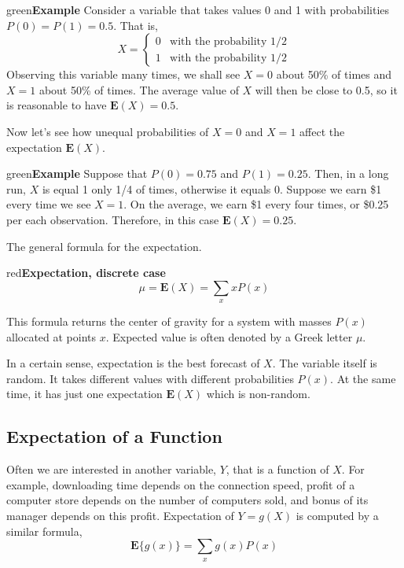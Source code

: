\documentclass{article}
\newenvironment{example}[1]{\begin{mybox}{green}{\textbf{Example #1}}}{\end{mybox}}
\newenvironment{formula}[1]{\begin{mybox}{red}{\textbf{#1}}}{\end{mybox}}
\begin{document}
\begin{example}{}
Consider a variable that takes values 0 and 1 with probabilities $P(0) =
P(1) = 0.5$. That is,
\begin{equation*}
    X = \begin{cases}
        0 &\text{with the probability 1/2}\\
        1 &\text{with the probability 1/2}
    \end{cases}
\end{equation*}
Observing this variable many times, we shall see $X = 0$ about 50\% of times and $X = 1$ about 50\% of times. The average value of $X$ will then be close to 0.5, so it is reasonable to have $\mathbf{E}(X) = 0.5$.
\end{example}
\noindent Now let’s see how unequal probabilities of $X = 0$ and $X = 1$ affect the expectation $\mathbf{E}(X)$.
\begin{example}{}
Suppose that $P(0) = 0.75$ and $P(1) = 0.25$. Then, in a long run, $X$ is equal
1 only 1/4 of times, otherwise it equals 0. Suppose we earn \$1 every time we see $X = 1$. On the average, we earn \$1 every four times, or \$0.25 per each observation. Therefore, in this case $\mathbf{E}(X) = 0.25$. 
\end{example}

\setcounter{equation}{2}

The general formula for the expectation.
\begin{formula}{Expectation, discrete case}
\begin{equation}
    \mu = \mathbf{E}(X) = \sum_x xP(x)
\end{equation}
\end{formula}
This formula returns the center of gravity for a system with masses $P(x)$ allocated at points $x$. Expected value is often denoted by a Greek letter $\mu$.

In a certain sense, expectation is the best forecast of $X$. The variable itself is random. It takes different values with different probabilities $P(x)$. At the same time, it has just one expectation $\mathbf{E}(X)$ which is non-random.

\subsection{Expectation of a Function}

Often we are interested in another variable, $Y$, that is a function of $X$. For example, downloading time depends on the connection speed, profit of a computer store depends on the number of computers sold, and bonus of its manager depends on this profit. Expectation of $Y = g(X)$ is computed by a similar formula,
\begin{equation}
    \mathbf{E}\{g(x)\} = \sum_x g(x)P(x)
\end{equation}
\end{document}
